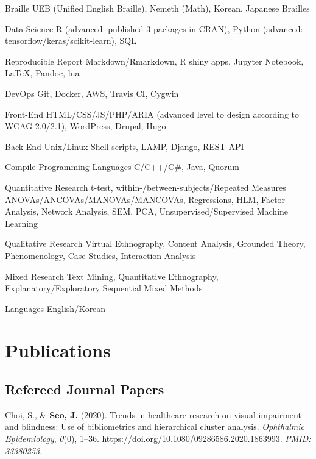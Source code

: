 \documentclass[11pt, a4paper]{awesome-cv}
\begin{document}
\begin{cvskills}
  \cvskill
    {Braille}
    {UEB (Unified English Braille), Nemeth (Math), Korean, Japanese Brailles}

  \cvskill
    {Data Science}
    {R (advanced: published 3 packages in CRAN), Python (advanced: tensorflow/keras/scikit-learn), SQL}

  \cvskill
    {Reproducible Report}
    {Markdown/Rmarkdown, R shiny apps, Jupyter Notebook, LaTeX, Pandoc, lua}

  \cvskill
    {DevOps}
    {Git, Docker, AWS, Travis CI, Cygwin}

  \cvskill
    {Front-End}
    {HTML/CSS/JS/PHP/ARIA (advanced level to design according to WCAG 2.0/2.1), WordPress, Drupal, Hugo}

  \cvskill
    {Back-End}
    {Unix/Linux Shell scripts, LAMP, Django, REST API}

  \cvskill
    {Compile Programming Languages}
    {C/C++/C\#, Java, Quorum}

  \cvskill
    {Quantitative Research}
    {t-test, within-/between-subjects/Repeated Measures ANOVAs/ANCOVAs/MANOVAs/MANCOVAs, Regressions, \newline HLM, Factor Analysis, Network Analysis, SEM, PCA, Unsupervised/Supervised Machine Learning}

  \cvskill
    {Qualitative Research}
    {Virtual Ethnography, Content Analysis, Grounded Theory, Phenomenology, Case Studies, Interaction Analysis}

  \cvskill
    {Mixed Research}
    {Text Mining, Quantitative Ethnography, Explanatory/Exploratory Sequential Mixed Methods}

  \cvskill
    {Languages}
    {English/Korean}
\end{cvskills}

\hypertarget{publications}{%
\section{Publications}\label{publications}}

\hypertarget{refereed-journal-papers}{%
\subsection{Refereed Journal Papers}\label{refereed-journal-papers}}

\hypertarget{refs_journals}{}
\leavevmode\hypertarget{ref-doi:10.1080ux2f09286586.2020.1863993}{}%
Choi, S., \& \textbf{Seo, J.} (2020). Trends in healthcare research on
visual impairment and blindness: Use of bibliometrics and hierarchical
cluster analysis. \emph{Ophthalmic Epidemiology}, \emph{0}(0), 1--36.
\url{https://doi.org/10.1080/09286586.2020.1863993}. \emph{PMID:
33380253}.
\end{document}
